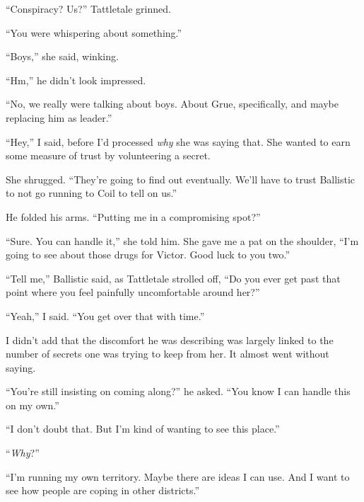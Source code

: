 ``Conspiracy?  Us?''  Tattletale grinned.



``You were whispering about something.''



``Boys,'' she said, winking.



``Hm,'' he didn't look impressed.



``No, we really were talking about boys.  About Grue, specifically, and maybe replacing him as leader.''



``Hey,'' I said, before I'd processed \emph{why} she was saying that.  She wanted to earn some measure of trust by volunteering a secret.



She shrugged.  ``They're going to find out eventually.  We'll have to trust Ballistic to not go running to Coil to tell on us.''



He folded his arms.  ``Putting me in a compromising spot?''



``Sure.  You can handle it,'' she told him.  She gave me a pat on the shoulder, ``I'm going to see about those drugs for Victor.  Good luck to you two.''



``Tell me,'' Ballistic said, as Tattletale strolled off, ``Do you ever get past that point where you feel painfully uncomfortable around her?''



``Yeah,'' I said.  ``You get over that with time.''



I didn't add that the discomfort he was describing was largely linked to the number of secrets one was trying to keep from her.  It almost went without saying.



``You're still insisting on coming along?'' he asked.  ``You know I can handle this on my own.''



``I don't doubt that.  But I'm kind of wanting to see this place.''



``\emph{Why}?''



``I'm running my own territory.  Maybe there are ideas I can use.  And I want to see how people are coping in other districts.''



